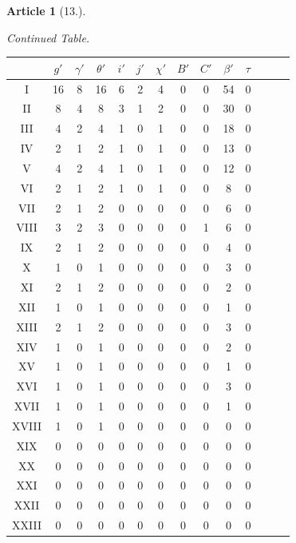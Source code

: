 \documentclass[11pt,a4paper]{article}
\theoremstyle{definition}
\newtheorem{art}{Article}
\begin{document}
\begin{art}[13.]
\begin{center}
\small
\textit{Continued Table.}
\begin{tabular}{|c|c|c|c|c|c|c|c|c|c|c|c|c|c|}
\hline
 & $g'$ & $\gamma'$ & $\theta'$ & $i'$ & $j'$ & $\chi'$ & $B'$ & $C'$ & $\beta'$ & $\tau$ \\
\hline
I & 16 & 8 & 16 & 6 & 2 & 4 & 0 & 0 & 54 & 0 \\
\hline
II & 8 & 4 & 8 & 3 & 1 & 2 & 0 & 0 & 30 & 0 \\
\hline
III & 4 & 2 & 4 & 1 & 0 & 1 & 0 & 0 & 18 & 0 \\
\hline
IV & 2 & 1 & 2 & 1 & 0 & 1 & 0 & 0 & 13 & 0 \\
\hline
V & 4 & 2 & 4 & 1 & 0 & 1 & 0 & 0 & 12 & 0 \\
\hline
VI & 2 & 1 & 2 & 1 & 0 & 1 & 0 & 0 & 8 & 0 \\
\hline
VII & 2 & 1 & 2 & 0 & 0 & 0 & 0 & 0 & 6 & 0 \\
\hline
VIII & 3 & 2 & 3 & 0 & 0 & 0 & 0 & 1 & 6 & 0 \\
\hline
IX & 2 & 1 & 2 & 0 & 0 & 0 & 0 & 0 & 4 & 0 \\
\hline
X & 1 & 0 & 1 & 0 & 0 & 0 & 0 & 0 & 3 & 0 \\
\hline
XI & 2 & 1 & 2 & 0 & 0 & 0 & 0 & 0 & 2 & 0 \\
\hline
XII & 1 & 0 & 1 & 0 & 0 & 0 & 0 & 0 & 1 & 0 \\
\hline
XIII & 2 & 1 & 2 & 0 & 0 & 0 & 0 & 0 & 3 & 0 \\
\hline
XIV & 1 & 0 & 1 & 0 & 0 & 0 & 0 & 0 & 2 & 0 \\
\hline
XV & 1 & 0 & 1 & 0 & 0 & 0 & 0 & 0 & 1 & 0 \\
\hline
XVI & 1 & 0 & 1 & 0 & 0 & 0 & 0 & 0 & 3 & 0 \\
\hline
XVII & 1 & 0 & 1 & 0 & 0 & 0 & 0 & 0 & 1 & 0 \\
\hline
XVIII & 1 & 0 & 1 & 0 & 0 & 0 & 0 & 0 & 0 & 0 \\
\hline
XIX & 0 & 0 & 0 & 0 & 0 & 0 & 0 & 0 & 0 & 0 \\
\hline
XX & 0 & 0 & 0 & 0 & 0 & 0 & 0 & 0 & 0 & 0 \\
\hline
XXI & 0 & 0 & 0 & 0 & 0 & 0 & 0 & 0 & 0 & 0 \\
\hline
XXII & 0 & 0 & 0 & 0 & 0 & 0 & 0 & 0 & 0 & 0 \\
\hline
XXIII & 0 & 0 & 0 & 0 & 0 & 0 & 0 & 0 & 0 & 0 \\
\hline
\end{tabular}
\end{center}
\end{art}
\end{document}
